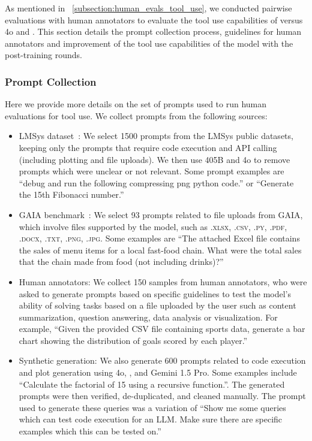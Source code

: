 As mentioned in ~\ref{subsection:human_evals_tool_use}, we conducted pairwise evaluations with human annotators to evaluate the tool use capabilities of \llamathree versus \gpt4o and \gptfourturbo. This section details the prompt collection process, guidelines for human annotators and improvement of the tool use capabilities of the model with the post-training rounds.
\subsubsection{Prompt Collection}
Here we provide more details on the set of prompts used to run human evaluations for tool use. We collect prompts from the following sources:
\begin{itemize}
    \item LMSys dataset~\citep{chiang2024chatbot}: We select 1500 prompts from the LMSys public datasets, keeping only the prompts that require code execution and API calling (including plotting and file uploads). We then use \llamathree 405B and \gpt4o to remove prompts which were unclear or not relevant. Some prompt examples are “debug and run the following compressing png python code.” or “Generate the 15th Fibonacci number.”

    \item GAIA benchmark~\citep{mialon2023gaia}: We select 93 prompts related to file uploads from GAIA, which involve files supported by the model, such as \textsc{.xlsx, .csv, .py, .pdf, .docx, .txt, .png, .jpg}. Some examples are “The attached Excel file contains the sales of menu items for a local fast-food chain. What were the total sales that the chain made from food (not including drinks)?”

    \item Human annotators: We collect 150 samples from human annotators, who were asked to generate prompts based on specific guidelines to test the model’s ability of solving tasks based on a file uploaded by the user such as content summarization, question answering, data analysis or visualization. For example, “Given the provided CSV file containing sports data, generate a bar chart showing the distribution of goals scored by each player.”

    \item Synthetic generation: We also generate 600 prompts related to code execution and plot generation using \gpt4o, \sonnet, \llamathree and Gemini 1.5 Pro. Some examples include “Calculate the factorial of 15 using a recursive function.”. The generated prompts were then verified, de-duplicated, and cleaned manually. The prompt used to generate these queries was a variation of “Show me some queries which can test code execution for an LLM. Make sure there are specific examples which this can be tested on.”

\end{itemize}

